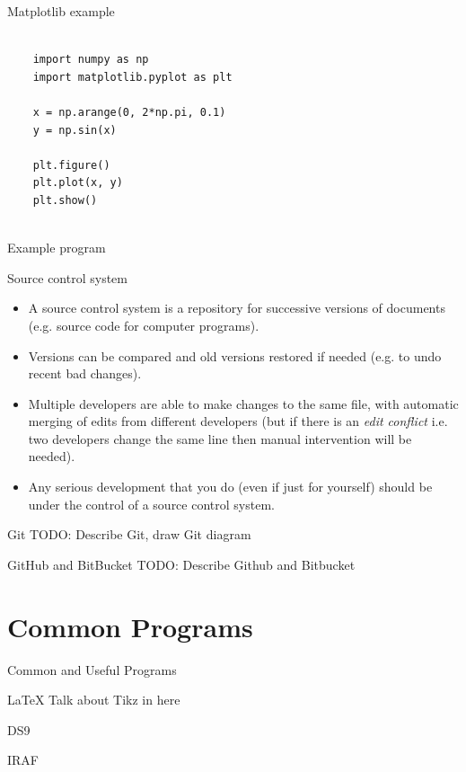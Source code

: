 \documentclass{beamer}
\begin{document}
\begin{frame}[fragile]{Matplotlib example}
  \begin{lstlisting}

    import numpy as np
    import matplotlib.pyplot as plt
  
    x = np.arange(0, 2*np.pi, 0.1)
    y = np.sin(x)
  
    plt.figure()
    plt.plot(x, y)
    plt.show()
  
  \end{lstlisting}
\end{frame}


\begin{frame}{Example program}

\end{frame}

\begin{frame}{Source control system}

  \begin{itemize}
    \item A source control system is a repository for successive versions of documents (e.g. source code for computer programs).
    \item Versions can be compared and old versions restored if needed (e.g. to undo recent bad changes).
    \item Multiple developers are able to make changes to the same file, with automatic merging of edits from different developers (but if there is an \textit{edit conflict} i.e. two developers change the same line then manual intervention will be needed).
    \item Any serious development that you do (even if just for yourself) should be under the control of a source control system.
  \end{itemize}
\end{frame}
    
\begin{frame}{Git}    
  TODO: Describe Git, draw Git diagram
\end{frame}


\begin{frame}{GitHub and BitBucket}    
  TODO: Describe Github and Bitbucket
\end{frame}




\section{Common Programs}
\begin{frame}{Common and Useful Programs}
  \begin{block}{LaTeX}
    Talk about Tikz in here
  \end{block}
  \begin{block}{DS9}
  \end{block}
  \begin{block}{IRAF}
  \end{block}
\end{frame}
\end{document}
